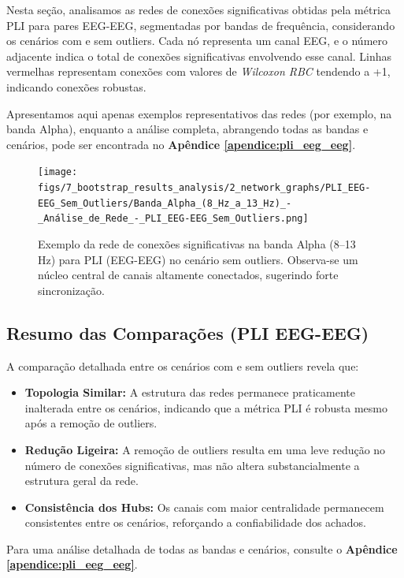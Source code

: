 Nesta seção, analisamos as redes de conexões significativas obtidas pela métrica PLI para pares EEG-EEG, segmentadas por bandas de frequência, considerando os cenários com e sem outliers. Cada nó representa um canal EEG, e o número adjacente indica o total de conexões significativas envolvendo esse canal. Linhas vermelhas representam conexões com valores de \emph{Wilcoxon RBC} tendendo a +1, indicando conexões robustas.

Apresentamos aqui apenas exemplos representativos das redes (por exemplo, na banda Alpha), enquanto a análise completa, abrangendo todas as bandas e cenários, pode ser encontrada no \textbf{Apêndice \ref{apendice:pli_eeg_eeg}}.

\begin{figure}[htb]
  \centering
  \texttt{[image: figs/7\_bootstrap\_results\_analysis/2\_network\_graphs/PLI\_EEG-EEG\_Sem\_Outliers/Banda\_Alpha\_(8\_Hz\_a\_13\_Hz)\_-\_Análise\_de\_Rede\_-\_PLI\_EEG-EEG\_Sem\_Outliers.png]}
  \caption{Exemplo da rede de conexões significativas na banda Alpha (8--13\,Hz) para PLI (EEG-EEG) no cenário sem outliers. Observa-se um núcleo central de canais altamente conectados, sugerindo forte sincronização.}
  \label{fig:exemplo_rede_pli_alpha_sem}
\end{figure}

\subsection{Resumo das Comparações (PLI EEG-EEG)}

A comparação detalhada entre os cenários com e sem outliers revela que:
\begin{itemize}
    \item \textbf{Topologia Similar:} A estrutura das redes permanece praticamente inalterada entre os cenários, indicando que a métrica PLI é robusta mesmo após a remoção de outliers.
    \item \textbf{Redução Ligeira:} A remoção de outliers resulta em uma leve redução no número de conexões significativas, mas não altera substancialmente a estrutura geral da rede.
    \item \textbf{Consistência dos Hubs:} Os canais com maior centralidade permanecem consistentes entre os cenários, reforçando a confiabilidade dos achados.
\end{itemize}

Para uma análise detalhada de todas as bandas e cenários, consulte o \textbf{Apêndice \ref{apendice:pli_eeg_eeg}}.

